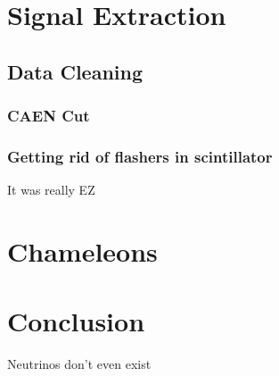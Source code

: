 
\section{Signal Extraction}
\subsection{Data Cleaning}
\subsubsection{CAEN Cut}
\subsubsection{Getting rid of  flashers in scintillator}
It was really EZ

\section{Chameleons}

\section{Conclusion}
Neutrinos don't even exist
